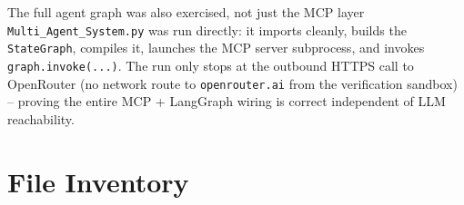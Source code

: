 \documentclass[11pt,a4paper]{article}
\begin{document}
\begin{infobox}{The full agent graph was also exercised, not just the MCP layer}
\texttt{Multi\_Agent\_System.py} was run directly: it imports cleanly,
builds the \texttt{StateGraph}, compiles it, launches the MCP server
subprocess, and invokes \texttt{graph.invoke(...)}. The run only stops at
the outbound HTTPS call to OpenRouter (no network route to
\texttt{openrouter.ai} from the verification sandbox) -- proving the
entire MCP + LangGraph wiring is correct independent of LLM reachability.
\end{infobox}

\section{File Inventory}
\label{sec:inventory}
\end{document}

